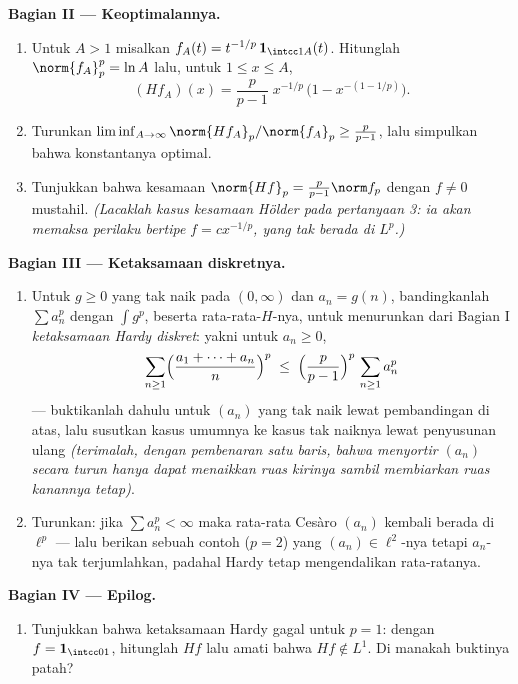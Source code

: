 \begin{problem}
\medskip
\noindent\textbf{Bagian II --- Keoptimalannya.}
\begin{enumerate}[resume]
  \item Untuk $A > 1$ misalkan $f_A(t) = t^{-1/p}\,\mathbf
        1_{\intcc1A}(t)$. Hitunglah $\norm{f_A}_p^p = \ln A$
        lalu, untuk $1 \leq x \leq A$,
        \[
        (Hf_A)(x) = \frac p{p-1}\;x^{-1/p}\,
        \bigl(1 - x^{-(1 - 1/p)}\bigr).
        \]
  \item Turunkan $\liminf_{A\to\infty} \norm{Hf_A}_p/
        \norm{f_A}_p \geq \frac{p}{p-1}$, lalu simpulkan bahwa
        konstantanya optimal.
  \item Tunjukkan bahwa kesamaan $\norm{Hf}_p = \frac
        p{p-1}\norm f_p$ dengan $f \neq 0$ mustahil.
        \emph{(Lacaklah kasus kesamaan Hölder pada pertanyaan
        3: ia akan memaksa perilaku bertipe $f = cx^{-1/p}$, yang
        tak berada di $L^p$.)}
\end{enumerate}

\medskip
\noindent\textbf{Bagian III --- Ketaksamaan diskretnya.}
\begin{enumerate}[resume]
  \item Untuk $g \geq 0$ yang tak naik pada $(0,\infty)$ dan
        $a_n = g(n)$, bandingkanlah $\sum a_n^p$ dengan $\int g^p$,
        beserta rata-rata-$H$-nya, untuk menurunkan dari Bagian I
        \emph{ketaksamaan Hardy diskret}: yakni untuk $a_n \geq 0$,
        \[
        \sum_{n\geq1}\Bigl(\frac{a_1 + \dots +
        a_n}{n}\Bigr)^{p}
        \;\leq\;
        \Bigl(\frac{p}{p-1}\Bigr)^{p}\,\sum_{n\geq1}a_n^p
        \]
        --- buktikanlah dahulu untuk $(a_n)$ yang tak naik lewat
        pembandingan di atas, lalu susutkan kasus umumnya ke
        kasus tak naiknya lewat penyusunan ulang \emph{(terimalah, dengan
        pembenaran satu baris, bahwa menyortir $(a_n)$ secara
        turun hanya dapat menaikkan ruas kirinya sambil
        membiarkan ruas kanannya tetap)}.
  \item Turunkan: jika $\sum a_n^p < \infty$ maka rata-rata Cesàro
        $(a_n)$ kembali berada di $\ell^p$ --- lalu berikan sebuah
        contoh ($p = 2$) yang $(a_n) \in \ell^2$-nya tetapi $a_n$-nya
        tak terjumlahkan, padahal Hardy tetap mengendalikan rata-ratanya.
\end{enumerate}

\medskip
\noindent\textbf{Bagian IV --- Epilog.}
\begin{enumerate}[resume]
  \item Tunjukkan bahwa ketaksamaan Hardy gagal untuk $p = 1$: dengan
        $f = \mathbf 1_{\intcc01}$, hitunglah $Hf$ lalu amati bahwa
        $Hf \notin L^1$. Di manakah buktinya patah?
\end{enumerate}


\end{problem}
